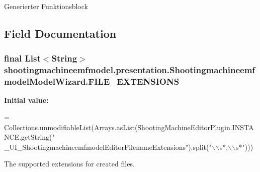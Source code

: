 Generierter Funktionsblock 

\subsection{Field Documentation}
\hypertarget{classshootingmachineemfmodel_1_1presentation_1_1_shootingmachineemfmodel_model_wizard_a21fe15dc665780770de69c92b64c791e}{
\subsubsection[{F\-I\-L\-E\-\_\-\-E\-X\-T\-E\-N\-S\-I\-O\-N\-S}]{\setlength{\rightskip}{0pt plus 5cm}final List$<$String$>$ shootingmachineemfmodel.\-presentation.\-Shootingmachineemfmodel\-Model\-Wizard.\-F\-I\-L\-E\-\_\-\-E\-X\-T\-E\-N\-S\-I\-O\-N\-S\hspace{0.3cm}{\ttfamily [static]}}}\label{classshootingmachineemfmodel_1_1presentation_1_1_shootingmachineemfmodel_model_wizard_a21fe15dc665780770de69c92b64c791e}
{\bfseries Initial value\-:}
\begin{DoxyCode}
=
        Collections.unmodifiableList(Arrays.asList(ShootingMachineEditorPlugin.INSTANCE.getString(\textcolor{stringliteral}{"
      \_UI\_ShootingmachineemfmodelEditorFilenameExtensions"}).split(\textcolor{stringliteral}{"\(\backslash\)\(\backslash\)s*,\(\backslash\)\(\backslash\)s*"})))
\end{DoxyCode}
The supported extensions for created files.

